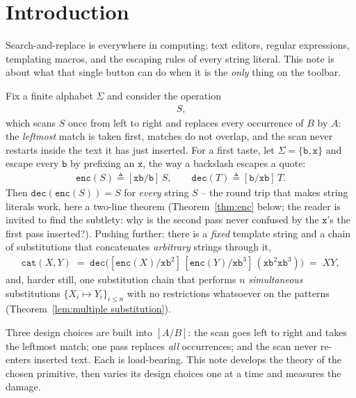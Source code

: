 \documentclass[runningheads,envcountsect]{llncs}
\begin{document}
\section{Introduction}

Search-and-replace is everywhere in computing: text editors, regular expressions, templating macros, and the escaping rules of every string literal. This note is about what that single button can do when it is the \emph{only} thing on the toolbar.

Fix a finite alphabet $\Sigma$ and consider the operation
\begin{align*}
    [A/B]\,S,
\end{align*}
which scans $S$ once from left to right and replaces every occurrence of $B$ by $A$: the \emph{leftmost} match is taken first, matches do not overlap, and the scan never restarts inside the text it has just inserted. For a first taste, let $\Sigma = \{\mathtt{b}, \mathtt{x}\}$ and escape every $\mathtt{b}$ by prefixing an $\mathtt{x}$, the way a backslash escapes a quote:
\begin{align*}
    \mathtt{enc}(S) \triangleq [\mathtt{xb}/\mathtt{b}]\,S, \qquad \mathtt{dec}(T) \triangleq [\mathtt{b}/\mathtt{xb}]\,T.
\end{align*}
Then $\mathtt{dec}(\mathtt{enc}(S)) = S$ for \emph{every} string $S$ -- the round trip that makes string literals work, here a two-line theorem (Theorem~\ref{thm:enc} below; the reader is invited to find the subtlety: why is the second pass never confused by the $\mathtt{x}$'s the first pass inserted?). Pushing further: there is a \emph{fixed} template string and a chain of substitutions that concatenates \emph{arbitrary} strings through it,
\begin{align*}
    \mathtt{cat}(X,Y) \;=\; \mathtt{dec}\big([\mathtt{enc}(X)/\mathtt{xb}^2]\,[\mathtt{enc}(Y)/\mathtt{xb}^3]\,(\mathtt{xb}^2\mathtt{xb}^3)\big) \;=\; XY,
\end{align*}
and, harder still, one substitution chain that performs $n$ \emph{simultaneous} substitutions $\{X_i \mapsto Y_i\}_{i \le n}$ with no restrictions whatsoever on the patterns (Theorem~\ref{lem:multiple substitution}).

Three design choices are built into $[A/B]$: the scan goes left to right and takes the leftmost match; one pass replaces \emph{all} occurrences; and the scan never re-enters inserted text. Each is load-bearing. This note develops the theory of the chosen primitive, then varies its design choices one at a time and measures the damage.
\end{document}
